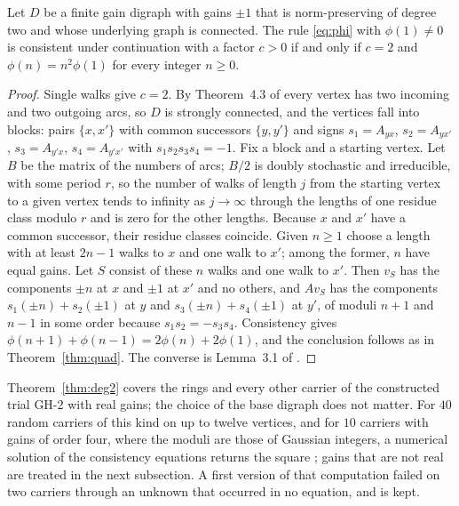 \begin{theorem}\label{thm:deg2}
Let $D$ be a finite gain digraph with gains $\pm1$ that is norm-preserving of degree two and whose underlying graph is connected. The rule \eqref{eq:phi} with $\phi(1)\ne0$ is consistent under continuation with a factor $c>0$ if and only if $c=2$ and $\phi(n)=n^2\phi(1)$ for every integer $n\ge0$.
\end{theorem}
\begin{proof}
Single walks give $c=2$. By Theorem~4.3 of \cite{g9} every vertex has two incoming and two outgoing arcs, so $D$ is strongly connected, and the vertices fall into blocks: pairs $\{x,x'\}$ with common successors $\{y,y'\}$ and signs $s_1=A_{yx}$, $s_2=A_{yx'}$, $s_3=A_{y'x}$, $s_4=A_{y'x'}$ with $s_1s_2s_3s_4=-1$. Fix a block and a starting vertex. Let $B$ be the matrix of the numbers of arcs; $B/2$ is doubly stochastic and irreducible, with some period $r$, so the number of walks of length $j$ from the starting vertex to a given vertex tends to infinity as $j\to\infty$ through the lengths of one residue class modulo $r$ and is zero for the other lengths. Because $x$ and $x'$ have a common successor, their residue classes coincide. Given $n\ge1$ choose a length with at least $2n-1$ walks to $x$ and one walk to $x'$; among the former, $n$ have equal gains. Let $S$ consist of these $n$ walks and one walk to $x'$. Then $v_S$ has the components $\pm n$ at $x$ and $\pm1$ at $x'$ and no others, and $Av_S$ has the components $s_1(\pm n)+s_2(\pm1)$ at $y$ and $s_3(\pm n)+s_4(\pm1)$ at $y'$, of moduli $n+1$ and $n-1$ in some order because $s_1s_2=-s_3s_4$. Consistency gives $\phi(n+1)+\phi(n-1)=2\phi(n)+2\phi(1)$, and the conclusion follows as in Theorem~\ref{thm:quad}. The converse is Lemma~3.1 of \cite{g9}.
\end{proof}

Theorem~\ref{thm:deg2} covers the rings and every other carrier of the constructed trial GH-2 with real gains; the choice of the base digraph does not matter. For $40$ random carriers of this kind on up to twelve vertices, and for $10$ carriers with gains of order four, where the moduli are those of Gaussian integers, a numerical solution of the consistency equations returns the square \cite{comp4s}; gains that are not real are treated in the next subsection. A first version of that computation failed on two carriers through an unknown that occurred in no equation, and is kept.

